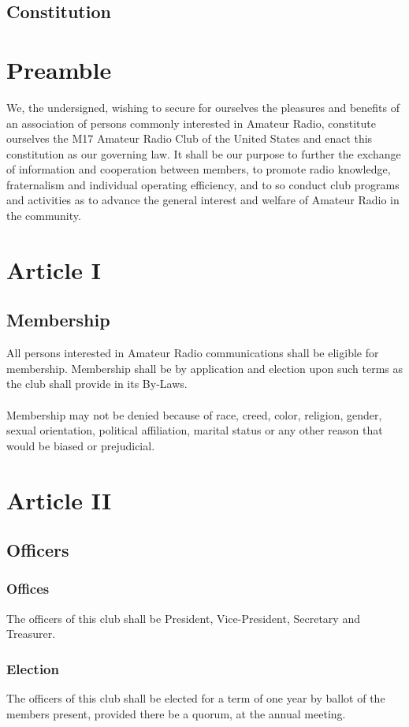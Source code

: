 \documentclass[english,12pt,letterpaper]{article}
\author{KC1AWV}
\begin{document}
	\begin{center}
		\section*{Constitution}
	\end{center}
	\section*{Preamble}
	We, the undersigned, wishing to secure for ourselves the pleasures and benefits of an association of persons commonly interested in Amateur Radio, constitute ourselves the M17 Amateur Radio Club of the United States and enact this constitution as our governing law. It shall be our purpose to further the exchange of information and cooperation between members, to promote radio knowledge, fraternalism and individual operating efficiency, and to so conduct club programs and activities as to advance the general interest and welfare of Amateur Radio in the community.
	\section*{Article I}
	\subsection*{Membership}
	All persons interested in Amateur Radio communications shall be eligible for membership. Membership shall be by application and election upon such terms as the club shall provide in its By-Laws. \\
	\\
	Membership may not be denied because of race, creed, color, religion, gender, sexual orientation, political affiliation, marital status or any other reason that would be biased or prejudicial.
	\section*{Article II}
	\subsection*{Officers}
	\subsubsection*{Offices}
	The officers of this club shall be President, Vice-President, Secretary and Treasurer.
	\subsubsection*{Election}
	The officers of this club shall be elected for a term of one year by ballot of the members present, provided there be a quorum, at the annual meeting.
\end{document}
